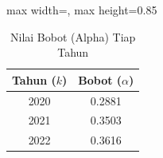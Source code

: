 \begin{table}[H]
\centering
\caption{Nilai Bobot (Alpha) Tiap Tahun} \label{tab:samplealpha}
\begin{adjustbox}{max width=\textwidth, max height=0.85\textheight}
\begin{tabular}{|c|c|}
\hline
\textbf{Tahun ($k$)} & \textbf{Bobot ($\alpha$)} \\
\hline
2020 & 0.2881 \\
2021 & 0.3503 \\
2022 & 0.3616 \\
\hline
\end{tabular}
\end{adjustbox}
\end{table}